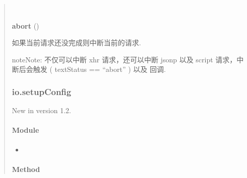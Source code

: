 \documentclass[letterpaper,10pt,english]{sphinxmanual}
\begin{document}
\begin{quote}
\begin{fulllineitems}
\begin{quote}
\begin{description}
\end{description}\end{quote}

\end{fulllineitems}



\begin{fulllineitems}
\label{api/core/ajax/xhr:io.abort}~
\begin{DUlineblock}{0em}
\item[] \textbf{abort} ()
\item[] 如果当前请求还没完成则中断当前的请求.
\end{DUlineblock}

\begin{notice}{note}{Note:}
不仅可以中断 xhr 请求，还可以中断 jsonp 以及 script 请求，中断后会触发 {\hyperref[api/core/ajax/io:io.cfg.error]{}} ( textStatus == ``abort'' ) 以及 {\hyperref[api/core/ajax/io:io.cfg.complete]{}} 回调.
\end{notice}

\end{fulllineitems}



\subsubsection{io.setupConfig}
\label{api/core/ajax/setupConfig:io-setupconfig}\label{api/core/ajax/setupConfig::doc}New in version 1.2.

\paragraph{Module}
\label{api/core/ajax/setupConfig:module}\begin{itemize}
\item {}
{\hyperref[api/core/ajax/index:module-io]{}}

\end{itemize}


\paragraph{Method}
\label{api/core/ajax/setupConfig:method}


\end{quote}
\end{document}
